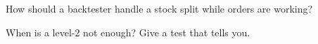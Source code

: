 \begin{interviewq}\label{iq:rs:event-driven-backtests:5}
How should a backtester handle a stock split while orders are working?
\end{interviewq}

\begin{interviewq}\label{iq:rs:event-driven-backtests:6}
When is a level-2  not enough? Give a test that tells you.
\end{interviewq}
